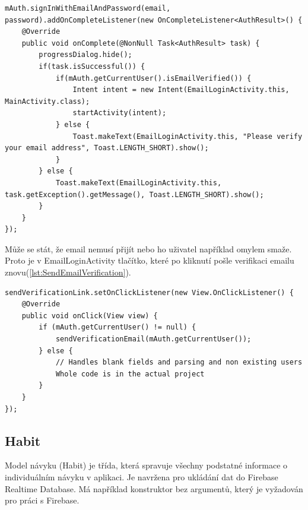 \begin{lstlisting}[style=javastyle,caption = {SignInWithEmailAndPassword},label = {lst:SignInWithEmailAndPassword}]
mAuth.signInWithEmailAndPassword(email, password).addOnCompleteListener(new OnCompleteListener<AuthResult>() {
    @Override
    public void onComplete(@NonNull Task<AuthResult> task) {
        progressDialog.hide();
        if(task.isSuccessful()) {
            if(mAuth.getCurrentUser().isEmailVerified()) {
                Intent intent = new Intent(EmailLoginActivity.this, MainActivity.class);
                startActivity(intent);
            } else {
                Toast.makeText(EmailLoginActivity.this, "Please verify your email address", Toast.LENGTH_SHORT).show();
            }
        } else {
            Toast.makeText(EmailLoginActivity.this, task.getException().getMessage(), Toast.LENGTH_SHORT).show();
        }
    }
});

\end{lstlisting}

Může se stát, že email nemusí přijít nebo ho uživatel například omylem smaže. Proto je v EmailLoginActivity tlačítko, které po kliknutí pošle verifikaci emailu znovu(\autoref{lst:SendEmailVerification}).

\begin{lstlisting}[style=javastyle,caption = {Send Email Verification},label = {lst:SendEmailVerification}]
sendVerificationLink.setOnClickListener(new View.OnClickListener() {
    @Override
    public void onClick(View view) {
        if (mAuth.getCurrentUser() != null) {
            sendVerificationEmail(mAuth.getCurrentUser());
        } else {
            // Handles blank fields and parsing and non existing users
            Whole code is in the actual project
        }
    }
});
\end{lstlisting}

\newpage

\subsection{Habit}
\hspace{14pt} Model návyku (Habit) je třída, která spravuje všechny podstatné informace o individuálním návyku v aplikaci. Je navržena pro ukládání dat do Firebase Realtime Database. Má například konstruktor bez argumentů, který je vyžadován pro práci s Firebase.

